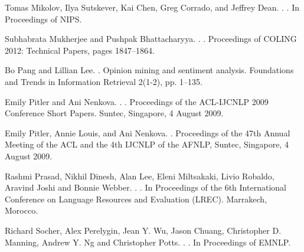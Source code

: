\documentclass[11pt,letterpaper]{article}
\begin{document}
\begin{thebibliography}{}
Tomas Mikolov, Ilya Sutskever, Kai Chen, Greg Corrado, and Jeffrey Dean. 
.
. 
\newblock In Proceedings of NIPS.

Subhabrata Mukherjee and Pushpak Bhattacharyya.
.
.
\newblock Proceedings of COLING 2012: Technical Papers, pages 1847–1864.

Bo Pang and Lillian Lee.
.
\newblock Opinion mining and sentiment analysis.
\newblock Foundations and Trends in Information Retrieval 2(1-2), pp. 1–135.


Emily Pitler and Ani Nenkova.
.
.
\newblock Proceedings of the ACL-IJCNLP 2009 Conference Short Papers.  Suntec, Singapore, 4 August 2009.

Emily Pitler, Annie Louis, and Ani Nenkova.
.
\newblock Proceedings of the 47th Annual Meeting of the ACL and the 4th IJCNLP of the AFNLP, Suntec, Singapore, 4 August 2009.

Rashmi Prasad, Nikhil Dinesh, Alan Lee, Eleni Miltsakaki, Livio Robaldo, Aravind Joshi and Bonnie Webber. 
.
. 
\newblock In Proceedings of the 6th International Conference on Language Resources and Evaluation (LREC). Marrakech, Morocco.

Richard Socher, Alex Perelygin, Jean Y. Wu, Jason Chuang,
Christopher D. Manning, Andrew Y. Ng and Christopher Potts.
.
.
\newblock In Proceedings of EMNLP.


\end{thebibliography}
\end{document}
